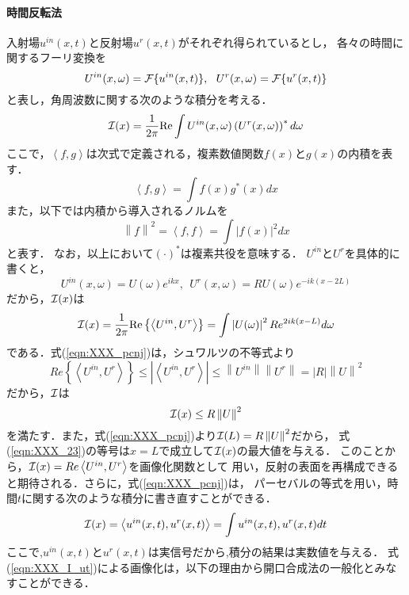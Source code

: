 \paragraph{時間反転法}
入射場$u^{in}(x,t)$と反射場$u^{r}(x,t)$がそれぞれ得られているとし，
各々の時間に関するフーリ変換を
\begin{equation}
	U^{in}(x,\omega)={\cal F} \{ u^{in}(x,t)\}, \ \ 
	U^{r}(x,\omega)={\cal F} \{ u^{r}(x,t)\}
	\label{eqn:XXX_19}
\end{equation}
と表し，角周波数に関する次のような積分を考える．
\begin{equation}
	{\cal I }(x)=
	\frac{1}{2\pi}
	{\rm Re }
	\int 	
	U^{in}(x,\omega)\left( U^{r}(x,\omega)\right)^* d\omega
	\label{eqn:XXX_20}
\end{equation}
ここで，$\left<f,g\right>$は次式で定義される，複素数値関数$f(x)$と$g(x)$の内積を表す．
\begin{equation}
	\left< f,g\right>=\int f(x)g^*(x)dx
	\label{eqn:XXX_21}
\end{equation}
また，以下では内積から導入されるノルムを
\begin{equation}
	\left\| f \right\|^2=\left<f,f\right> =\int |f(x)|^2dx
	\label{eqn:XXX_21}
\end{equation}
と表す． なお，以上において$(\cdot)^*$は複素共役を意味する．
$U^{in}$と$U^{r}$を具体的に書くと，
\begin{equation}
	U^{in}(x,\omega)=U(\omega)e^{ikx}, \ \ 
	U^{r}(x,\omega)=RU(\omega)e^{-ik(x-2L)}
	\label{eqn:XXX_22}
\end{equation}
だから，${\cal I}(x)$は
\begin{equation}
	{\cal I}(x)
	=
	\frac{1}{2\pi}
	{\rm Re }
	\left\{ 
	\left< U^{in},U^{r}\right>
	\right\}
	=
	\int 
	\left| U(\omega) \right|^2 
	R
	e^{2ik(x-L)}d\omega
	\label{eqn:XXX_pcnj}
\end{equation}
である．式(\ref{eqn:XXX_pcnj})は，シュワルツの不等式より
\begin{equation}
	Re \left\{ \left< U^{in}, U^{r}\right> \right\}
	\leq 
	\left| \left< U^{in},U^{r} \right> \right|
	\leq  \left\| U^{in}\right\| \left\| U^{r}\right\|
	=\left| R \right|
	\left\| U\right\|^2
	\label{eqn:XXX_23}
\end{equation}
だから，${\cal I}$は
\begin{equation}
	{\cal I}(x) \leq R \left\| U \right\|^2
	\label{eqn:}
\end{equation}
を満たす．また，式(\ref{eqn:XXX_pcnj})より${\cal I}(L)=R \left\| U\right\|^2$だから，
式(\ref{eqn:XXX_23})の等号は$x=L$で成立して${\cal I}(x)$の最大値を与える．
このことから，${\cal I}(x)=Re \left<U^{in},U^{r}\right>$を画像化関数として
用い，反射の表面を再構成できると期待される．さらに，式(\ref{eqn:XXX_pcnj})は，
パーセバルの等式を用い，時間$t$に関する次のような積分に書き直すことができる．
\begin{equation}
	{\cal I}(x)= \left< u^{in}(x,t), u^{r}(x,t)\right>
	=\int u^{in}(x,t), u^{r}(x,t) dt
	\label{eqn:XXX_I_ut}
\end{equation}
ここで,$u^{in}(x,t)$と$u^r(x,t)$は実信号だから,積分の結果は実数値を与える．
式(\ref{eqn:XXX_I_ut})による画像化は，以下の理由から開口合成法の一般化とみなすことができる．


